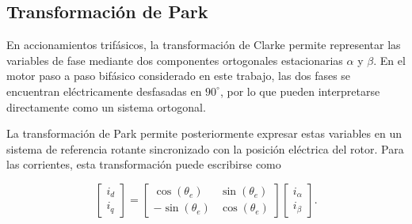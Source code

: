 %
%
%



\subsection{Transformación de Park}

%
%
%
%

En accionamientos trifásicos, la transformación de Clarke permite representar 
las variables de fase mediante dos componentes ortogonales estacionarias 
$\alpha$ y $\beta$. En el motor paso a paso bifásico considerado en este 
trabajo, las dos fases se encuentran eléctricamente desfasadas en $90^\circ$, 
por lo que pueden interpretarse directamente como un sistema ortogonal.

La transformación de Park permite posteriormente expresar estas variables en 
un sistema de referencia rotante sincronizado con la posición eléctrica del 
rotor. Para las corrientes, esta transformación puede escribirse como

\begin{equation}
\label{eq:park}
\begin{bmatrix}
    i_d \\
    i_q
\end{bmatrix}
=
\begin{bmatrix}
    \cos(\theta_e) & \sin(\theta_e) \\
    -\sin(\theta_e) & \cos(\theta_e)
\end{bmatrix}
\begin{bmatrix}
    i_{\alpha} \\
    i_{\beta}
\end{bmatrix}.
\end{equation}

